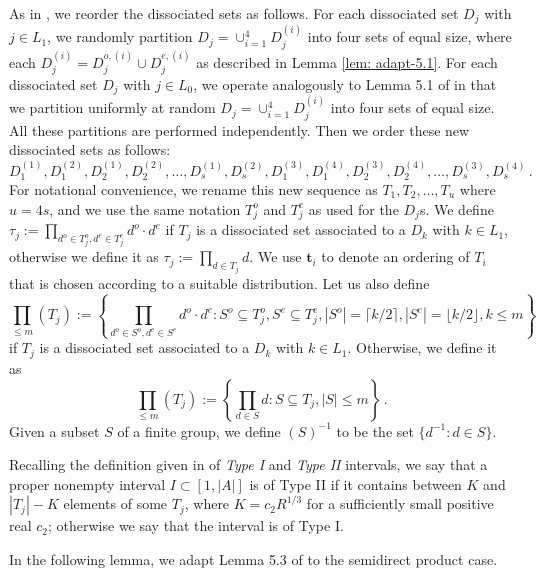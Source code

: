 \documentclass[11pt]{amsart}
\theoremstyle{definition}
\begin{document}
As in \cite{BK}, we reorder the dissociated sets as follows. For each dissociated set $D_j$ with $j\in L_1$, we randomly partition $D_j= \cup_{i=1}^4 D_j^{(i)}$ into four sets of equal size, where each $D_j^{(i)} = D_j^{o, (i)} \cup D_j^{e, (i)}$ as described in Lemma \ref{lem: adapt-5.1}. For each dissociated set $D_j$ with $j \in L_0$, we operate analogously to Lemma 5.1 of \cite{BK} in that we partition uniformly at random $D_j = \cup_{i=1}^4 D_j^{(i)}$ into four sets of equal size.
All these partitions are performed independently. Then we order these new dissociated sets as follows:
\begin{equation}\label{eq: new-order-dissociated}
D_1^{(1)}, D_1^{(2)}, D_2^{(1)}, D_2^{(2)}, \ldots, D_s^{(1)}, D_s^{(2)}, D_1^{(3)}, D_1^{(4)},D_2^{(3)}, D_2^{(4)}, \ldots, D_s^{(3)}, D_s^{(4)}\,.
\end{equation}
For notational convenience, we rename this new sequence as $T_1, T_2, \ldots, T_u$ where $u = 4s$, and we use the same notation $T_j^o$ and $T_j^e$ as used for the $D_j$s. We define $\tau_j := \prod_{d^o \in T_j^o, d^e \in T_j^e} d^o \cdot d^e$
if $T_j$ is a dissociated set associated to a $D_k$ with $k \in L_1$, otherwise we define it as $\tau_j := \prod_{d \in T_j} d$. We use $\mathbf{t}_i$ to denote an ordering of $T_i$ that is chosen according to a suitable distribution.
Let us also define 
\begin{equation}\label{eq: prod_subsets_dih}
\prod_{\leq m} (T_j) := \left\{ \prod_{d^o \in S^o, d^e \in S^e} d^o \cdot d^e : S^o \subseteq T_j^o, S^e \subseteq T_j^e, |S^o|= \lceil k/2 \rceil, |S^e|=\lfloor k/2 \rfloor, k \leq m\right\}
\end{equation}
if $T_j$ is a dissociated set associated to a $D_k$ with $k \in L_1$. Otherwise, we define it as
\begin{equation}\label{eq: prod_subsets}
	\prod_{\leq m} (T_j) := \left\{ \prod_{d \in S} d : S \subseteq T_j, |S| \leq m \right\}\,.
\end{equation}
Given a subset $S$ of a finite group, we define $(S)^{-1}$ to be the set $\{d^{-1} : d \in S\}$.

Recalling the definition given in \cite{BK} of \textit{Type I} and \textit{Type II} intervals, we say that a proper nonempty interval $I \subset [1, |A|]$ is of Type II if it contains between $K$ and $|T_j| - K$ elements of some $T_j$, where $K = c_2 R^{1/3}$ for a sufficiently small positive real $c_2$; otherwise we say that the interval is of Type I.

In the following lemma, we adapt Lemma 5.3 of \cite{BK} to the semidirect product case.
\end{document}

